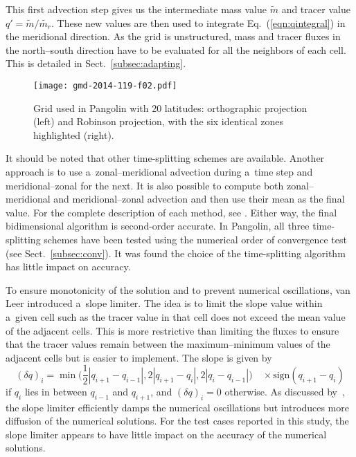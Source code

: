    This first advection step gives us the intermediate mass value
   $\widetilde{m}$ and tracer value
   $q'=\widetilde{m}/\widetilde{m_r}$. These new values are then used
   to integrate Eq.~(\ref{eqn:qintegral}) in the meridional direction.
   As the grid is unstructured, mass and tracer fluxes in the
   north--south direction have to be evaluated for all the neighbors
   of each cell. This is detailed in Sect.~\ref{subsec:adapting}.


\begin{figure*}[t]
  \begin{centering}
\texttt{[image: gmd-2014-119-f02.pdf]}
\caption{Grid used in Pangolin with 20 latitudes: orthographic projection
    (left) and Robinson projection, with the six identical zones highlighted
  (right).}
\label{fig2:pango_grid}%
  \end{centering}
\end{figure*}


   It should be noted that other time-splitting schemes are available. Another
   approach is to use a~zonal--meridional advection during a~time step and
   meridional--zonal for the next. It is also possible to compute both
   zonal--meridional and meridional--zonal advection and then use their mean as
   the final value. For the complete description of each method, see
   \citet{Machenhauer2009}. Either way, the final bidimensional algorithm is
   second-order accurate. In Pangolin, all three time-splitting schemes
   have been tested using the numerical order of convergence test  (see
   Sect.~\ref{subsec:conv}). It was found the choice of the time-splitting
   algorithm has little impact on accuracy.

   To ensure monotonicity of the solution and to prevent numerical
   oscillations, van Leer introduced a~slope limiter. The idea is to
   limit the slope value within a~given cell such as the tracer value
   in that cell does not exceed the mean value of the adjacent
   cells. This is more restrictive than limiting the fluxes to ensure
   that the tracer values remain between the maximum--minimum values of
   the adjacent cells but is easier to implement. The slope is given
   by
   \begin{equation}
     (\delta q)_i =
     \min\Big(\frac{1}{2} |q_{i+1}-q_{i-1}|, 2|q_{i+1}-q_i|, 2|q_i-q_{i-1}|\Big)
     \quad \times \text{sign}(q_{i+1} - q_i)
     \label{eqn:slope2}
   \end{equation}
    if $q_i$ lies in between $q_{i-1}$ and $q_{i+1}$, and $(\delta
    q)_i =0$ otherwise.  As discussed by~\citet{Hourdin1999}, the
    slope limiter efficiently damps the numerical oscillations but
    introduces more diffusion of the numerical solutions. For the test
    cases reported in this study, the slope limiter appears to have
    little impact on the accuracy of the numerical solutions.



